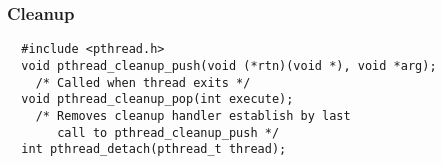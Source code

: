 \documentclass[10pt]{article}
\begin{document}
\begin{multicols}{2}
\begin{minipage}{\columnwidth}
        \subsubsection*{Cleanup}
        \begin{lstlisting}
  #include <pthread.h>
  void pthread_cleanup_push(void (*rtn)(void *), void *arg);
    /* Called when thread exits */
  void pthread_cleanup_pop(int execute);
    /* Removes cleanup handler establish by last
       call to pthread_cleanup_push */
  int pthread_detach(pthread_t thread);
        \end{lstlisting}
    \end{minipage}
\end{multicols}
\end{document}
